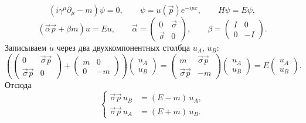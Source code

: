 \documentclass[../final.tex]{subfiles}
\begin{document}
\begin{equation*}
    \left(i\gamma^\mu\partial_\mu-m\right)\psi=0,
    \qquad
    \psi=u(\vec p)e^{-ipx},
    \qquad
    H\psi=E\psi,
\end{equation*}
\begin{equation*}
    \left(\vec\alpha\vec p+\beta m\right)u=Eu,
    \qquad
    \vec\alpha=
    \begin{pmatrix}
        0&\vec\sigma\\
        \vec\sigma&0
    \end{pmatrix},
    \qquad
    \beta=
    \begin{pmatrix}
        I&0\\
        0&-I
    \end{pmatrix}.
\end{equation*}
Записываем $u$ через два двухкомпонентных столбца $u_A$, $u_B$:
\begin{equation*}
    \left(
    \begin{pmatrix}
        0&\vec\sigma\vec p\\
        \vec\sigma\vec p&0
    \end{pmatrix}
    +
    \begin{pmatrix}
        m&0\\
        0&-m
    \end{pmatrix}
    \right)
    \begin{pmatrix}
        u_A\\ u_B
    \end{pmatrix}
    =
    \begin{pmatrix}
        m&\vec\sigma\vec p\\
        \vec\sigma\vec p&-m
    \end{pmatrix}
    \begin{pmatrix}
        u_A\\ u_B
    \end{pmatrix}
    =E
    \begin{pmatrix}
        u_A\\ u_B
    \end{pmatrix}.
\end{equation*}
Отсюда
\begin{equation*}
    \left\{
    \begin{aligned}
        \vec\sigma\vec p\,u_B&=(E-m)\,u_A,\\
        \vec\sigma\vec p\,u_A&=(E+m)\,u_B.
    \end{aligned}
    \right.
\end{equation*}
\end{document}
